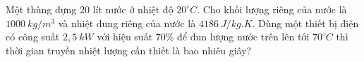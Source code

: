 \begin{ex}%
	Một thùng đựng $20$ lít nước ở nhiệt độ $20^{\circ}C$. Cho khối lượng riêng của nước là $1000\ kg/m^3$ và nhiệt dung riêng của nước là $4186\ J/kg.K$. Dùng một thiết bị điện có công suất $2,5\ kW$ với hiệu suất $70\%$ để đun lượng nước trên lên tới $70^{\circ}C$ thì thời gian truyền nhiệt lượng cần thiết là bao nhiêu giây?
\end{ex}

